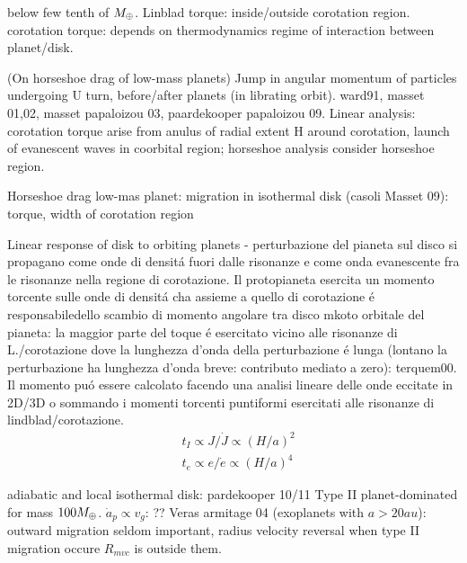 \begin{workout}[M14:type I]
below few tenth of $M_{\oplus}{}$.
Linblad torque: inside/outside corotation region.
corotation torque: depends on thermodynamics regime of interaction between planet/disk.
\end{workout}

\begin{workout}
(On horseshoe drag of low-mass planets)
Jump in angular momentum of particles undergoing U turn, before/after planets (in librating orbit).
ward91, masset 01,02, masset papaloizou 03, paardekooper papaloizou 09.
Linear analysis: corotation torque arise from anulus of radial extent H around corotation, launch of evanescent waves in coorbital region; horseshoe analysis consider horseshoe region.
\end{workout}

\begin{workout}
Horseshoe drag low-mas planet: migration in isothermal disk (casoli Masset 09): torque, width of corotation region
\end{workout}

\begin{workout}
Linear response of disk to orbiting planets - perturbazione del pianeta sul disco si propagano come onde di densit\'a fuori dalle risonanze e come onda evanescente fra le risonanze nella regione di corotazione. Il protopianeta esercita un momento torcente sulle onde di densit\'a cha assieme  a quello di corotazione \'e responsabiledello scambio di momento angolare tra disco mkoto orbitale del pianeta: la maggior parte del toque \'e esercitato vicino alle risonanze di L./corotazione dove la lunghezza d'onda della perturbazione \'e lunga (lontano la perturbazione ha lunghezza d'onda breve: contributo mediato a zero): terquem00.
Il momento pu\'o essere calcolato facendo una analisi lineare delle onde eccitate in 2D/3D o sommando i momenti torcenti puntiformi esercitati alle risonanze di lindblad/corotazione.
\begin{align}
&t_I\propto J/\dot{J}\propto(H/a)^2\\
&t_e\propto e/\dot{e}\propto(H/a)^4
\end{align}
\end{workout}

\begin{workout}
adiabatic and local isothermal disk: pardekooper 10/11
Type II planet-dominated for mass $100M_{\oplus}{}$.
$\dot{a}_p\propto v_g$: ??
Veras armitage 04 (exoplanets with $a>20au$): outward migration seldom important, radius velocity reversal when type II migration occure $R_{mvc}$ is outside them.
\end{workout}


